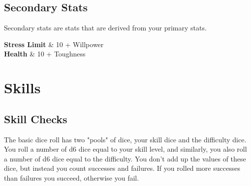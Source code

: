 \section{Secondary Stats}

Secondary stats are stats that are derived from your primary stats.


{}
{
    \textbf{Stress Limit}  & 10 + Willpower\\
    \textbf{Health}        & 10 + Toughness\\
}{}



\chapter{Skills}

\section{Skill Checks}

The basic dice roll has two "pools" of dice, your skill dice and the difficulty dice. 
You roll a number of d6 dice equal to your skill level, and similarly, you also roll a number of d6 dice equal to the difficulty. You don't add up the values of these dice, but instead you count successes and failures.
If you rolled more successes than failures you succeed, otherwise you fail.

